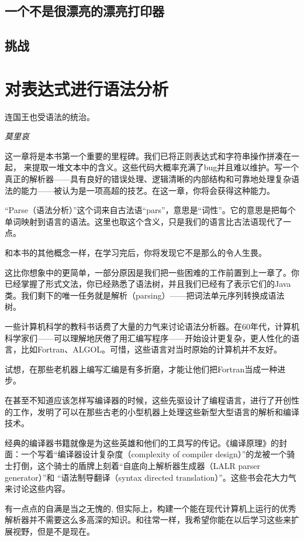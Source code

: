 \documentclass[cn,10pt,math=newtx,citestyle=gb7714-2015,bibstyle=gb7714-2015]{elegantbook}
\begin{document}
\section{一个不是很漂亮的漂亮打印器}

\section{挑战}

\chapter{对表达式进行语法分析}

\epigraph{连国王也受语法的统治。}{\textit{莫里哀}}

这一章将是本书第一个重要的里程碑。我们已将正则表达式和字符串操作拼凑在一起， 来提取一堆文本中的含义。这些代码大概率充满了bug并且难以维护。写一个真正的解析器——具有良好的错误处理、逻辑清晰的内部结构和可靠地处理复杂语法的能力——被认为是一项高超的技艺。在这一章，你将会获得这种能力。

“Parse（语法分析）”这个词来自古法语“pars”，意思是“词性”。它的意思是把每个单词映射到语言的语法。这里也取这个含义，只是我们的语言比古法语现代了一点。

和本书的其他概念一样，在学习完后，你将发现它不是那么的令人生畏。

这比你想象中的更简单，一部分原因是我们把一些困难的工作前置到上一章了。你已经掌握了形式文法，你已经熟悉了语法树，并且我们已经有了表示它们的Java类。我们剩下的唯一任务就是解析（parsing）——把词法单元序列转换成语法树。

一些计算机科学的教科书话费了大量的力气来讨论语法分析器。在60年代，计算机科学家们——可以理解地厌倦了用汇编写程序——开始设计更复杂，更人性化的语言，比如Fortran、ALGOL。可惜，这些语言对当时原始的计算机并不友好。

试想，在那些老机器上编写汇编是有多折磨，才能让他们把Fortran当成一种进步。

在甚至不知道应该怎样写编译器的时候，这些先驱设计了编程语言，进行了开创性的工作，发明了可以在那些古老的小型机器上处理这些新型大型语言的解析和编译技术。

经典的编译器书籍就像是为这些英雄和他们的工具写的传记。《编译原理》的封面：一个写着“编译器设计复杂度（complexity of compiler design）”的龙被一个骑士打倒，这个骑士的盾牌上刻着“自底向上解析器生成器（LALR parser generator）”和 “语法制导翻译（syntax directed translation）”。这些书会花大力气来讨论这些内容。

有一点点的自满是当之无愧的, 但实际上，构建一个能在现代计算机上运行的优秀解析器并不需要这么多高深的知识。和往常一样，我希望你能在以后学习这些来扩展视野，但是不是现在。
\end{document}
